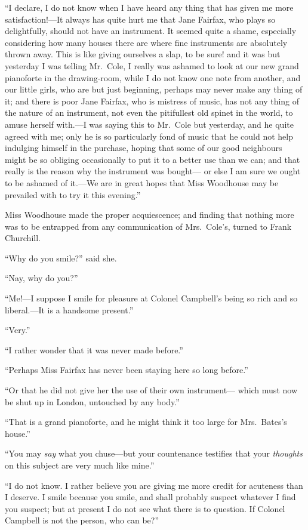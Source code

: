 ``I declare, I do not know when I have heard any thing that has given
me more satisfaction!---It always has quite hurt me that Jane Fairfax,
who plays so delightfully, should not have an instrument.
It seemed quite a shame, especially considering how many houses
there are where fine instruments are absolutely thrown away.
This is like giving ourselves a slap, to be sure! and it was
but yesterday I was telling Mr.\ Cole, I really was ashamed
to look at our new grand pianoforte in the drawing-room, while I
do not know one note from another, and our little girls, who are
but just beginning, perhaps may never make any thing of it;
and there is poor Jane Fairfax, who is mistress of music, has not
any thing of the nature of an instrument, not even the pitifullest
old spinet in the world, to amuse herself with.---I was saying this
to Mr.\ Cole but yesterday, and he quite agreed with me; only he
is so particularly fond of music that he could not help indulging
himself in the purchase, hoping that some of our good neighbours might
be so obliging occasionally to put it to a better use than we can;
and that really is the reason why the instrument was bought---%
or else I am sure we ought to be ashamed of it.---We are in great
hopes that Miss Woodhouse may be prevailed with to try it this evening.''

Miss Woodhouse made the proper acquiescence; and finding that nothing
more was to be entrapped from any communication of Mrs.\ Cole's,
turned to Frank Churchill.

``Why do you smile?'' said she.

``Nay, why do you?''

``Me!---I suppose I smile for pleasure at Colonel Campbell's being
so rich and so liberal.---It is a handsome present.''

``Very.''

``I rather wonder that it was never made before.''

``Perhaps Miss Fairfax has never been staying here so long before.''

``Or that he did not give her the use of their own instrument---%
which must now be shut up in London, untouched by any body.''

``That is a grand pianoforte, and he might think it too large
for Mrs.\ Bates's house.''

``You may \emph{say} what you chuse---but your countenance testifies
that your \emph{thoughts} on this subject are very much like mine.''

``I do not know.  I rather believe you are giving me more credit for
acuteness than I deserve.  I smile because you smile, and shall probably
suspect whatever I find you suspect; but at present I do not see what
there is to question.  If Colonel Campbell is not the person, who can be?''

